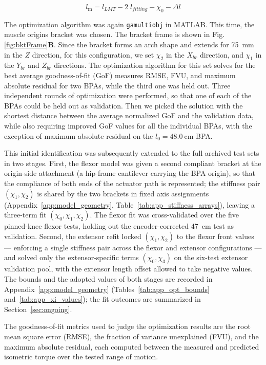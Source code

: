 \begin{equation}
    l_\text{m} = l_{LMT} - 2\;l_{fitting}  - \chi_{0} - \Delta l\label{eq:x3}
\end{equation}

The optimization algorithm was again \texttt{gamultiobj} in MATLAB. This time, the muscle origins bracket was chosen. The bracket frame is shown in Fig. \ref{fig:bktFrame}\textbf{B}. Since the bracket forms an arch shape and extends for \qty{75}{\mm} in the $Z$ direction, for this configuration, we set $\chi_{2}$ in the $X_{br}$ direction, and $\chi_{1}$ in the $Y_{br}$ and $Z_{br}$ directions. The optimization algorithm for this set solves for the best average goodness-of-fit (GoF) measures RMSE, FVU, and maximum absolute residual for two BPAs, while the third one was held out. Three independent rounds of optimization were performed, so that one of each of the BPAs could be held out as validation. Then we picked the solution with the shortest distance between the average normalized GoF and the validation data, while also requiring improved GoF values for all the individual BPAs, with the exception of maximum absolute residual on the $l_{0}=\qty{48.0}{\cm}$ BPA.

This initial identification was subsequently extended to the full archived test sets in two stages. First, the flexor model was given a second compliant bracket at the origin-side attachment (a hip-frame cantilever carrying the BPA origin), so that the compliance of both ends of the actuator path is represented; the stiffness pair $(\chi_{1}, \chi_{2})$ is shared by the two brackets in fixed axis assignments (Appendix~\ref{app:model_geometry}, Table~\ref{tab:app_stiffness_arrays}), leaving a three-term fit $(\chi_{0}, \chi_{1}, \chi_{2})$. The flexor fit was cross-validated over the five pinned-knee flexor tests, holding out the encoder-corrected \qty{47}{\cm} test as validation. Second, the extensor refit locked $(\chi_{1}, \chi_{2})$ to the flexor front values --- enforcing a single stiffness pair across the flexor and extensor configurations --- and solved only the extensor-specific terms $(\chi_{0}, \chi_{3})$ on the six-test extensor validation pool, with the extensor length offset allowed to take negative values. The bounds and the adopted values of both stages are recorded in Appendix~\ref{app:model_geometry} (Tables~\ref{tab:app_opt_bounds} and~\ref{tab:app_xi_values}); the fit outcomes are summarized in Section~\ref{sec:ongoing}.

The goodness-of-fit metrics used to judge the optimization results are the root mean square error (RMSE), the fraction of variance unexplained (FVU), and the maximum absolute residual, each computed between the measured and predicted isometric torque over the tested range of motion.

